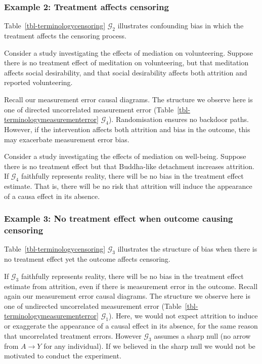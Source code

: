\documentclass[
  single column]{article}
\begin{document}
\subsubsection{Example 2: Treatment affects
censoring}\label{example-2-treatment-affects-censoring}

Table~\ref{tbl-terminologycensoring} \(\mathcal{G}_2\) illustrates
confounding bias in which the treatment affects the censoring process.

Consider a study investigating the effects of mediation on volunteering.
Suppose there is no treatment effect of meditation on volunteering, but
that meditation affects social desirability, and that social
desirability affects both attrition and reported volunteering.

Recall our measurement error causal diagrams. The structure we observe
here is one of directed uncorrelated measurement error
(Table~\ref{tbl-terminologymeasurementerror} \(\mathcal{G}_4\)).
Randomisation ensures no backdoor paths. However, if the intervention
affects both attrition and bias in the outcome, this may exacerbate
measurement error bias.

Consider a study investigating the effects of mediation on well-being.
Suppose there is no treatment effect but that Buddha-like detachment
increases attrition. If \(\mathcal{G}_4\) faithfully represents reality,
there will be no bias in the treatment effect estimate. That is, there
will be no risk that attrition will induce the appearance of a causa
effect in its absence.

\subsubsection{Example 3: No treatment effect when outcome causing
censoring}\label{example-3-no-treatment-effect-when-outcome-causing-censoring}

Table~\ref{tbl-terminologycensoring} \(\mathcal{G}_3\) illustrates the
structure of bias when there is no treatment effect yet the outcome
affects censoring.

If \(\mathcal{G}_3\) faithfully represents reality, there will be no
bias in the treatment effect estimate from attrition, even if there is
measurement error in the outcome. Recall again our measurement error
causal diagrams. The structure we observe here is one of undirected
uncorrelated measurement error
(Table~\ref{tbl-terminologymeasurementerror} \(\mathcal{G}_1\)). Here,
we would not expect attrition to induce or exaggerate the appearance of
a causal effect in its absence, for the same reason that uncorrelated
treatment errors. However \(\mathcal{G}_3\) assumes a sharp null (no
arrow from \(A\to Y\) for any individual). If we believed in the sharp
null we would not be motivated to conduct the experiment.
\end{document}
